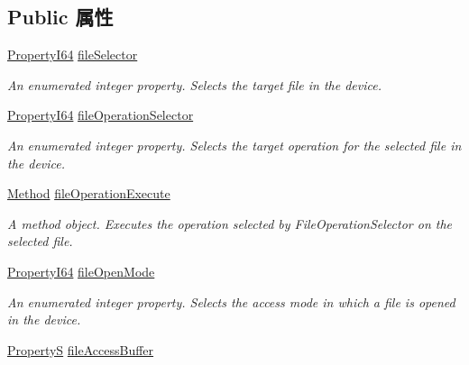 \subsection*{Public 属性}
\begin{DoxyCompactItemize}
\item 
\hyperlink{group___common_interface_ga81749b2696755513663492664a18a893}{Property\+I64} \hyperlink{classmv_i_m_p_a_c_t_1_1acquire_1_1_gen_i_cam_1_1_file_access_control_ac9dbcb001cea7d1cf901e71265e384e0}{file\+Selector}
\begin{DoxyCompactList}\small\item\em An enumerated integer property. Selects the target file in the device. \end{DoxyCompactList}\item 
\hyperlink{group___common_interface_ga81749b2696755513663492664a18a893}{Property\+I64} \hyperlink{classmv_i_m_p_a_c_t_1_1acquire_1_1_gen_i_cam_1_1_file_access_control_a1f5569c43561d1a144dc8ae6fc5bb477}{file\+Operation\+Selector}
\begin{DoxyCompactList}\small\item\em An enumerated integer property. Selects the target operation for the selected file in the device. \end{DoxyCompactList}\item 
\hyperlink{classmv_i_m_p_a_c_t_1_1acquire_1_1_method}{Method} \hyperlink{classmv_i_m_p_a_c_t_1_1acquire_1_1_gen_i_cam_1_1_file_access_control_ae711a06491fa4bc8b5a707ce5a5135c4}{file\+Operation\+Execute}
\begin{DoxyCompactList}\small\item\em A method object. Executes the operation selected by File\+Operation\+Selector on the selected file. \end{DoxyCompactList}\item 
\hyperlink{group___common_interface_ga81749b2696755513663492664a18a893}{Property\+I64} \hyperlink{classmv_i_m_p_a_c_t_1_1acquire_1_1_gen_i_cam_1_1_file_access_control_ab897a73644bac00e623b80287360fa7b}{file\+Open\+Mode}
\begin{DoxyCompactList}\small\item\em An enumerated integer property. Selects the access mode in which a file is opened in the device. \end{DoxyCompactList}\item 
\hyperlink{classmv_i_m_p_a_c_t_1_1acquire_1_1_property_s}{Property\+S} \hyperlink{classmv_i_m_p_a_c_t_1_1acquire_1_1_gen_i_cam_1_1_file_access_control_adec95e8c921aa8ad11ab285a1c8dd696}{file\+Access\+Buffer}

\end{DoxyCompactItemize}
